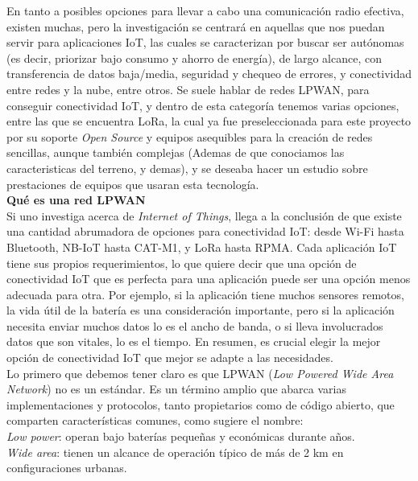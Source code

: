 \documentclass[12pt]{article}
\begin{document}
	\noindent En tanto a posibles opciones para llevar a cabo una comunicación radio efectiva, existen muchas, pero la investigación se centrará en aquellas que nos puedan servir para aplicaciones IoT, las cuales se caracterizan por buscar ser autónomas (es decir, priorizar bajo consumo y ahorro de energía), de largo alcance, con transferencia de datos baja/media, seguridad y chequeo de errores, y conectividad entre redes y la nube, entre otros. Se suele hablar de redes LPWAN, para conseguir conectividad IoT, y dentro de esta categoría tenemos varias opciones, entre las que se encuentra LoRa, la cual ya fue preseleccionada para este proyecto por su soporte \textit{Open Source} y equipos asequibles para la creación de redes sencillas, aunque también complejas (Ademas de que conociamos las caracteristicas del terreno, y demas), y se deseaba hacer un estudio sobre prestaciones de equipos que usaran esta tecnología.\\
	
	\noindent \textbf{Qué es una red LPWAN} \\
	
	\noindent Si uno investiga acerca de \textit{Internet of Things}, llega a la conclusión de que existe una cantidad abrumadora de opciones para conectividad IoT: desde Wi-Fi hasta Bluetooth, NB-IoT hasta CAT-M1, y LoRa hasta RPMA. Cada aplicación IoT tiene sus propios requerimientos, lo que quiere decir que una opción de conectividad IoT que es perfecta para una aplicación puede ser una opción menos adecuada para otra. Por ejemplo, si la aplicación tiene muchos sensores remotos, la vida útil de la batería es una consideración importante, pero si la aplicación necesita enviar muchos datos lo es el ancho de banda, o si lleva involucrados datos que son vitales, lo es el tiempo. En resumen, es crucial elegir la mejor opción de conectividad IoT que mejor se adapte a las necesidades. \\
	
	\noindent Lo primero que debemos tener claro es que LPWAN (\textit{Low Powered Wide Area Network}) no es un estándar. Es un término amplio que abarca varias implementaciones y protocolos, tanto propietarios como de código abierto, que comparten características comunes, como sugiere el nombre: \\
	
	\noindent \textit{Low power}: operan bajo baterías pequeñas y económicas durante años. \\
	
	\noindent \textit{Wide area}: tienen un alcance de operación típico de más de 2 km en configuraciones urbanas.\\
	
\end{document}
